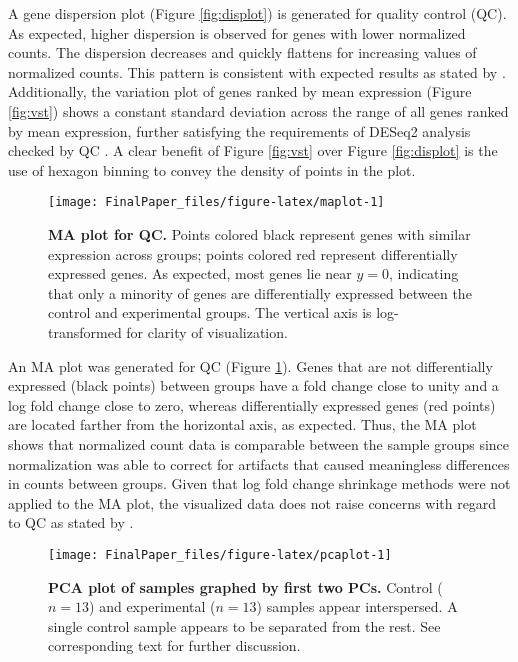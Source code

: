 A gene dispersion plot (Figure \ref{fig:displot}) is generated for
quality control (QC). As expected, higher dispersion is observed for
genes with lower normalized counts. The dispersion decreases and quickly
flattens for increasing values of normalized counts. This pattern is
consistent with expected results as stated by \citet{deseq}.
Additionally, the variation plot of genes ranked by mean expression
(Figure \ref{fig:vst}) shows a constant standard deviation across the
range of all genes ranked by mean expression, further satisfying the
requirements of DESeq2 analysis checked by QC \citep{deseq}. A clear
benefit of Figure \ref{fig:vst} over Figure \ref{fig:displot} is the use
of hexagon binning to convey the density of points in the plot.

\begin{Schunk}
\begin{figure}
\texttt{[image: FinalPaper\_files/figure-latex/maplot-1]} \caption{\label{fig:maplot}\textbf{MA plot for QC.} Points colored black represent genes with similar expression across groups; points colored red represent differentially expressed genes. As expected, most genes lie near $y=0$, indicating that only a minority of genes are differentially expressed between the control and experimental groups. The vertical axis is log-transformed for clarity of visualization.}\label{fig:maplot}
\end{figure}
\end{Schunk}

An MA plot was generated for QC (Figure \ref{fig:maplot}). Genes that
are not differentially expressed (black points) between groups have a
fold change close to unity and a log fold change close to zero, whereas
differentially expressed genes (red points) are located farther from the
horizontal axis, as expected. Thus, the MA plot shows that normalized
count data is comparable between the sample groups since normalization
was able to correct for artifacts that caused meaningless differences in
counts between groups. Given that log fold change shrinkage methods were
not applied to the MA plot, the visualized data does not raise concerns
with regard to QC as stated by \citet{deseq}.

\begin{Schunk}
\begin{figure}
\texttt{[image: FinalPaper\_files/figure-latex/pcaplot-1]} \caption{\label{fig:pcaplot}\textbf{PCA plot of samples graphed by first two PCs.} Control ($n=13$) and experimental ($n=13$) samples appear interspersed. A single control sample appears to be separated from the rest. See corresponding text for further discussion.}\label{fig:pcaplot}
\end{figure}
\end{Schunk}

